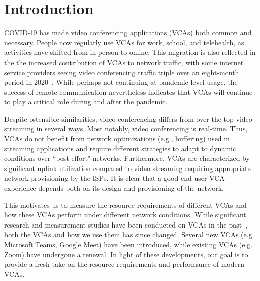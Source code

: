 \section{Introduction}\label{sec:intro}
COVID-19 has made video conferencing applications (VCAs) both common and necessary. People now regularly use VCAs for work, school, and telehealth, as activities have shifted from in-person to online. This migration is also reflected in the the increased contribution of VCAs to network traffic, with some internet service providers seeing video conferencing traffic triple over an eight-month period in 2020~\cite{bitag_report}. While perhaps not continuing at pandemic-level usage, the success of remote communication nevertheless indicates that VCAs will continue to play a critical role during and after the pandemic.



Despite ostensible similarities, video conferencing differs from over-the-top video streaming in several ways. Most notably, video conferencing is real-time. Thus, VCAs do not benefit from network optimizations (e.g., buffering) used in streaming applications and require different strategies to adapt to dynamic conditions over ``best-effort" networks. Furthermore, VCAs are characterized by significant uplink utilization compared to video streaming requiring appropriate network provisioning by the ISPs. It is clear that a good end-user VCA experience depends both on its design and provisioning of the network.   %

This motivates us to measure the resource requirements of different VCAs and how these VCAs perform under different network conditions. 
While significant research and measurement studies have been conducted on VCAs in the past~\cite{guha2005experimental, baset2004analysis, bonfiglio2008detailed, bonfiglio2008tracking, xu2012video}, both the VCAs and how we use them has since changed. Several new VCAs (e.g. Microsoft Teams, Google Meet) have been introduced, while existing VCAs (e.g. Zoom) have undergone a renewal. In light of these developments, our goal is to provide a fresh take on the resource requirements and performance of modern VCAs. 


